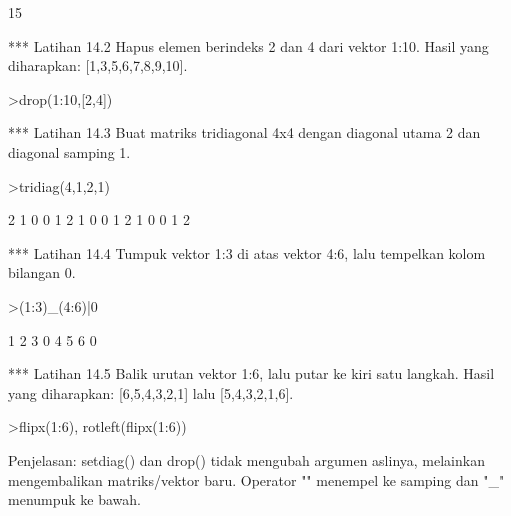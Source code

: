 \documentclass[a4paper,10pt]{article}
\begin{document}
\begin{eulernotebook}
\begin{eulercomment}
\begin{eulercomment}
\begin{eulercomment}
\begin{eulercomment}
\begin{eulercomment}
\begin{eulercomment}
\begin{eulercomment}
\begin{eulercomment}
\begin{eulercomment}
\begin{eulercomment}
\begin{eulercomment}
\begin{eulercomment}
\begin{eulercomment}
\begin{eulercomment}
\begin{euleroutput}
  15
\end{euleroutput}
\begin{eulercomment}
*** Latihan 14.2
Hapus elemen berindeks 2 dan 4 dari vektor 1:10.
Hasil yang diharapkan: [1,3,5,6,7,8,9,10].
\end{eulercomment}
\begin{eulerprompt}
>drop(1:10,[2,4])
\end{eulerprompt}
\begin{euleroutput}
  [1,  3,  5,  6,  7,  8,  9,  10]
\end{euleroutput}
\begin{eulercomment}
*** Latihan 14.3
Buat matriks tridiagonal 4x4 dengan diagonal utama 2 dan diagonal samping 1.
\end{eulercomment}
\begin{eulerprompt}
>tridiag(4,1,2,1)
\end{eulerprompt}
\begin{euleroutput}
              2             1             0             0 
              1             2             1             0 
              0             1             2             1 
              0             0             1             2 
\end{euleroutput}
\begin{eulercomment}
*** Latihan 14.4
Tumpuk vektor 1:3 di atas vektor 4:6, lalu tempelkan kolom bilangan 0.
\end{eulercomment}
\begin{eulerprompt}
>(1:3)_(4:6)|0
\end{eulerprompt}
\begin{euleroutput}
              1             2             3             0 
              4             5             6             0 
\end{euleroutput}
\begin{eulercomment}
*** Latihan 14.5
Balik urutan vektor 1:6, lalu putar ke kiri satu langkah.
Hasil yang diharapkan: [6,5,4,3,2,1] lalu [5,4,3,2,1,6].
\end{eulercomment}
\begin{eulerprompt}
>flipx(1:6), rotleft(flipx(1:6))
\end{eulerprompt}
\begin{euleroutput}
  [6,  5,  4,  3,  2,  1]
  [5,  4,  3,  2,  1,  6]
\end{euleroutput}
\begin{eulercomment}
Penjelasan: setdiag() dan drop() tidak mengubah argumen aslinya, melainkan
mengembalikan matriks/vektor baru. Operator "\textbar{}" menempel ke samping dan "\_"
menumpuk ke bawah.


\end{eulercomment}
\end{eulercomment}
\end{eulercomment}
\end{eulercomment}
\end{eulercomment}
\end{eulercomment}
\end{eulercomment}
\end{eulercomment}
\end{eulercomment}
\end{eulercomment}
\end{eulercomment}
\end{eulercomment}
\end{eulercomment}
\end{eulercomment}
\end{eulercomment}
\end{eulernotebook}
\end{document}
